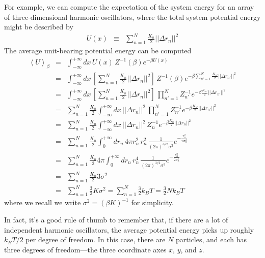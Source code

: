 \documentclass[english,course]{lecture}
\begin{document}
For example, we can compute the expectation of the system energy for an array of three-dimensional harmonic oscillators, where the total system potential energy might be described by
\begin{eqnarray}
U(x) &\equiv& \sum_{n=1}^N \frac{K_n}{2} ||\Delta r_n||^2
\end{eqnarray}
The average unit-bearing potential energy can be computed 
\begin{eqnarray}
\left< U \right>_\beta &=& \int_{-\infty}^{+\infty} dx \, U(x) \, Z^{-1}(\beta) e^{-\beta U(x)} \\
&=& \int_{-\infty}^{+\infty} dx \, \left[ \sum_{n=1}^N \frac{K_n}{2} ||\Delta r_n||^2 \right] \, Z^{-1}(\beta) e^{-\beta \sum_{n'=1}^N \frac{K_{n'}}{2} ||\Delta r_{n'}||^2} \\
&=& \int_{-\infty}^{+\infty} dx \, \left[ \sum_{n=1}^N \frac{K_n}{2} ||\Delta r_n||^2 \right] \, \prod_{n'=1}^N Z_{n'}^{-1} e^{-\beta \frac{K_{n'}}{2} ||\Delta r_{n'}||^2} \\
&=& \sum_{n=1}^N \frac{K_n}{2} \int_{-\infty}^{+\infty} dx \, ||\Delta r_n||^2 \, \prod_{n'=1}^N Z_{n'}^{-1} e^{-\beta \frac{K_{n'}}{2} ||\Delta r_{n'}||^2} \\
&=& \sum_{n=1}^N \frac{K_n}{2} \int_{-\infty}^{+\infty} dx \, ||\Delta r_n||^2 \,  Z_{n}^{-1} e^{-\beta \frac{K_{n}}{2} ||\Delta r_{n}||^2} \\
&=& \sum_{n=1}^N \frac{K_n}{2} \int_0^{+\infty} dr_n \, 4 \pi r_n^2 \, r_n^2 \,  \frac{1}{(2 \pi)^{3/2} \sigma^3} e^{-\frac{r_n^2}{2 \sigma_n^2}} \\
&=& \sum_{n=1}^N \frac{K_n}{2} 4 \pi \int_0^{+\infty} dr_n \, r_n^4 \,  \frac{1}{(2 \pi)^{3/2} \sigma^3} e^{-\frac{r_n^2}{2 \sigma_n^2}} \\
&=& \sum_{n=1}^N \frac{K_n}{2} 3 \sigma^2 \\
&=& \sum_{n=1}^N \frac{3}{2} K \sigma^2 = \sum_{n=1}^N \frac{3}{2} k_B T = \frac{3}{2} N k_B T 
\end{eqnarray}
where we recall we write $\sigma^2 = (\beta K)^{-1}$ for simplicity.

In fact, it's a good rule of thumb to remember that, if there are a lot of independent harmonic oscillators, the average potential energy picks up roughly $k_B T / 2$ per degree of freedom. 
In this case, there are $N$ particles, and each has three degrees of freedom---the three coordinate axes $x$, $y$, and $z$.
\end{document}

